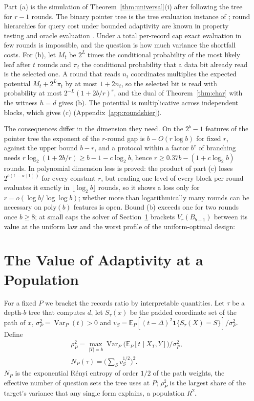 \documentclass{article}
\newcommand{\E}{\mathbb{E}}
\newcommand{\Var}{\operatorname{Var}}
\begin{document}
Part (a) is the simulation of Theorem~\ref{thm:universal}(i) after following the tree for $r-1$ rounds. The binary pointer tree is the tree evaluation instance of \citet{cook2012}; round hierarchies for query cost under bounded adaptivity are known in property testing and oracle evaluation \citep{canonne2018,li2026regex}. Under a total per-record cap exact evaluation in few rounds is impossible, and the question is how much variance the shortfall costs. For (b), let $M_t$ be $2^{L}$ times the conditional probability of the most likely leaf after $t$ rounds and $\pi_t$ the conditional probability that a data bit already read is the selected one. A round that reads $n_t$ coordinates multiplies the expected potential $M_t+2^L\pi_t$ by at most $1+2n_t$, so the selected bit is read with probability at most $2^{-L}(1+2b/r)^r$, and the dual of Theorem~\ref{thm:char} with the witness $h=d$ gives (b). The potential is multiplicative across independent blocks, which gives (c) (Appendix~\ref{app:roundshier}).

The consequences differ in the dimension they need. On the $2^b-1$ features of the pointer tree the exponent of the $r$-round gap is $b-O(r\log b)$ for fixed $r$, against the upper bound $b-r$, and a protocol within a factor $b^c$ of branching needs $r\log_2(1+2b/r)\ge b-1-c\log_2b$, hence $r\ge0.37b-(1+c\log_2b)$ rounds. In polynomial dimension less is proved: the product of part (c) loses $2^{b(1-o(1))}$ for every constant $r$, but reading one level of every block per round evaluates it exactly in $\lfloor\log_2b\rfloor$ rounds, so it shows a loss only for $r=o(\log b/\log\log b)$; whether more than logarithmically many rounds can be necessary on $\mathrm{poly}(b)$ features is open. Bound (b) exceeds one for two rounds once $b\ge8$; at small caps the solver of Section~\ref{sec:population} brackets $V_r(B_{b-1})$ between its value at the uniform law and the worst profile of the uniform-optimal design: \nPointerSentence{}

\section{The Value of Adaptivity at a Population}\label{sec:population}
For a fixed $P$ we bracket the records ratio by interpretable quantities. Let $\tau$ be a depth-$b$ tree that computes $d$, let $S_\tau(x)$ be the padded coordinate set of the path of $x$, $\sigma_P^2=\Var_P(t)>0$ and $v_S=\E_P[(t-\Delta)^2\mathbf 1\{S_\tau(X)=S\}]/\sigma_P^2$. Define
\begin{gather*}
 \rho_P^2=\max_{|T|=b}\Var_P\big(\E_P[t\mid X_T,Y]\big)\big/\sigma_P^2,\\
 N_P(\tau)=\Big(\sum\nolimits_Sv_S^{1/2}\Big)^2.
\end{gather*}
$N_P$ is the exponential R\'enyi entropy of order $1/2$ of the path weights, the effective number of question sets the tree uses at $P$; $\rho_P^2$ is the largest share of the target's variance that any single form explains, a population $R^2$.
\end{document}
